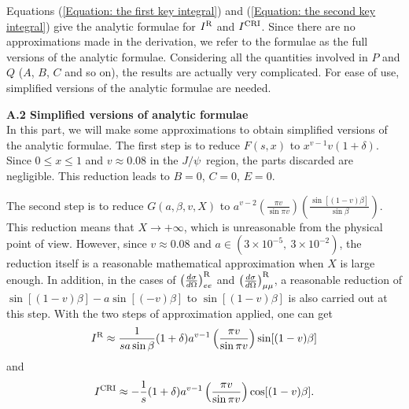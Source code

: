 \documentclass[a4paper,10pt,twoside]{cpc-hepnp}
\newcommand{\jpsi}{$J/\psi$~}
\begin{document}
\begin{CJK*}{UTF8}{gbsn}
\begin{small}
\begin{multicols}{2}
		Equations (\ref{Equation: the first key integral}) and (\ref{Equation: the second key integral}) give the analytic formulae for $I^{\rm R}$ and $I^{\rm CRI}$. Since there are no approximations made in the derivation, we refer to the formulae as the full versions of the analytic formulae. Considering all the quantities involved in $P$ and $Q$ ($A$, $B$, $C$ and so on), the results are actually very complicated. For ease of use, simplified versions of the analytic formulae are needed.
		
		\noindent \textbf{A.2 Simplified versions of analytic formulae} \\
		
		In this part, we will make some approximations to obtain simplified versions of the analytic formulae. The first step is to reduce $F(s,x)$ to $x^{v-1}v(1+\delta)$. Since $0 \le x \le 1$ and $v \approx 0.08$ in the \jpsi region, the parts discarded are negligible. This reduction leads to $B=0$, $C=0$, $E=0$.
		
		The second step is to reduce $G(a,\beta,v,X)$ to $a^{v-2} \left(\frac{\pi v}{\sin\pi v}\right) \left(\frac{\sin[(1-v)\beta]}{\sin\beta}\right)$. This reduction means that $X \to +\infty$, which is unreasonable from the physical point of view. However, since $v \approx 0.08$ and $a \in (3\times 10^{-5},\  3\times 10^{-2})$, the reduction itself is a reasonable mathematical approximation when $X$ is large enough. In addition, in the cases of $\left(\frac{d\sigma}{d\Omega}\right)_{ee}^{\rm R}$ and $\left(\frac{d\sigma}{d\Omega}\right)_{\mu\mu}^{\rm R}$, a reasonable reduction of $\sin[(1-v)\beta] - a\sin[(-v)\beta]$ to $\sin[(1-v)\beta]$ is also carried out at this step. With the two steps of approximation applied, one can get
		\begin{equation}
			I^{\rm R} \approx \frac{1}{s a\sin\beta} (1+\delta) a^{v-1} \left(\frac{\pi v}{\sin\pi v}\right) \sin[(1-v)\beta]
		\end{equation}
		and
		\begin{equation}
			I^{\rm CRI} \approx - \frac{1}{s} (1+\delta) a^{v-1} \left(\frac{\pi v}{\sin\pi v}\right) \cos[(1-v)\beta].
		\end{equation}
		

\end{multicols}
\end{small}
\end{CJK*}
\end{document}
